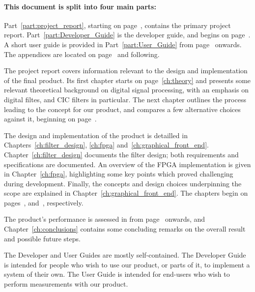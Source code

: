 \paragraph{This        document        is        split        into        four
main        parts:} Part~\ref{part:project_report},         starting        on
page~\pageref{part:project_report},     contains    the     primary    project
report. Part~\ref{part:Developer_Guide}  is the  developer  guide, and  begins
on  page~\pageref{part:Developer_Guide}. A short  user  guide  is provided  in
Part~\ref{part:User_Guide}  from  page~\pageref{part:User_Guide}  onwards. The
appendices are located on page~\pageref{ch:app:fdesign} and following.

The   project  report   covers  information   relevant  to   the  design   and
implementation   of   the  final   product. Its   first   chapter  starts   on
page~\ref{ch:theory}  and presents  some  relevant  theoretical background  on
digital signal processing, with an emphasis on digital filtes, and CIC filters
in particular. The  next chapter outlines  the process leading to  the concept
for our product, and compares a  few alternative choices against it, beginning
on page~\pageref{ch:mission}.

The       design      and       implementation       of      the       product
is     detailled     in     Chapters~\ref{ch:filter_design},     \ref{ch:fpga}
and~\ref{ch:graphical_front_end}. Chapter~\ref{ch:filter_design} documents the
filter  design;  both  requirements   and  specifications  are  documented. An
overview  of  the  FPGA  implementation  is  given  in  Chapter~\ref{ch:fpga},
highlighting    some   key    points   which    proved   challenging    during
development. Finally,   the   concepts   and   design   choices   underpinning
the   scope   are   explained   in   Chapter~\ref{ch:graphical_front_end}. The
chapters   begin    on   pages~\pageref{ch:filter_design},   \pageref{ch:fpga}
and~\pageref{ch:graphical_front_end}, respectively.

The  product's  performance  is assessed  in  \emph{}
from page~\pageref{ch:verification}  onwards, and Chapter~\ref{ch:conclusions}
contains some  concluding remarks  on the overall  result and  possible future
steps.

The Developer and  User Guides are mostly  self-contained. The Developer Guide
is  intended for  people who  wish to  use  our product,  or parts  of it,  to
implement a system of their own. The  User Guide is intended for end-users who
wish to perform measurements with our product.

